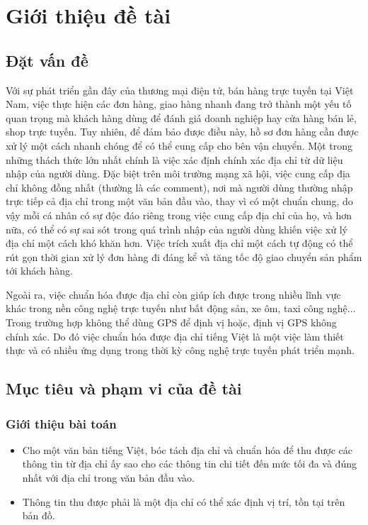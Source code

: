 \setcounter{chapter}{0}
\chapter{Giới thiệu đề tài }
\section{Đặt vấn đề }
Với sự phát triển gần đây của thương mại điện tử, bán hàng trực tuyến tại Việt Nam, việc thực hiện các đơn hàng, giao hàng nhanh đang trở thành một yếu tố quan trọng mà khách hàng dùng để đánh giá doanh nghiệp hay cửa hàng bán lẻ, shop trực tuyến. Tuy nhiên, để đảm bảo được điều này, hồ sơ đơn hàng cần được xử lý một cách nhanh chóng để có thể cung cấp cho bên vận chuyển. Một trong những thách thức lớn nhất chính là việc xác định chính xác địa chỉ từ dữ liệu nhập của người dùng. Đặc biệt trên môi trường mạng xã hội, việc cung cấp địa chỉ không đồng nhất (thường là các comment), nơi mà người dùng thường nhập trực tiếp cả địa chỉ trong một văn bản đầu vào, thay vì có một chuẩn chung, do vậy mỗi cá nhân có sự độc đáo riêng trong việc cung cấp địa chỉ của họ, và hơn nữa, có thể có sự sai sót trong quá trình nhập của người dùng khiến việc xử lý địa chỉ một cách khó khăn hơn. Việc trích xuất địa chỉ một cách tự động có thể rút gọn thời gian xử lý đơn hàng đi đáng kể và tăng tốc độ giao chuyển sản phẩm tới khách hàng. 

Ngoài ra, việc chuẩn hóa được địa chỉ còn giúp ích được trong nhiều lĩnh vực khác trong nền công nghệ trực tuyến như bất động sản, xe ôm, taxi công nghệ... Trong trường hợp không thể dùng GPS để định vị hoặc, định vị GPS không chính xác. Do đó việc chuẩn hóa được địa chỉ tiếng Việt là một việc làm thiết thực và có nhiều ứng dụng trong thời kỳ công nghệ trực tuyến phát triển mạnh.

\section{Mục tiêu và phạm vi của đề tài}
\subsection{Giới thiệu bài toán}
\begin{itemize}
    \item Cho một văn bản tiếng Việt, bóc tách địa chỉ và chuẩn hóa để thu được các thông tin từ địa chỉ ấy sao cho các thông tin chi tiết đến mức tối đa và đúng nhất với địa chỉ trong văn bản đầu vào.
    \item Thông tin thu được phải là một địa chỉ có thể xác định vị trí, tồn tại trên bản đồ.
\end{itemize}
